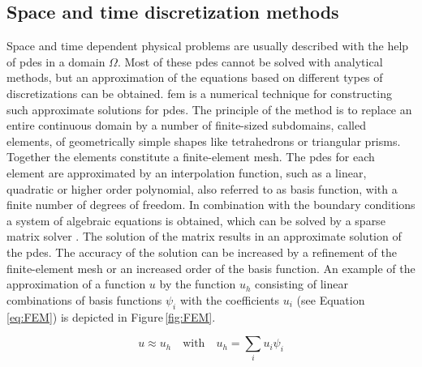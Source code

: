 \subsection{Space and time discretization methods}
\label{subsec:FEM}
\FloatBarrier
Space and time dependent physical problems are usually described with the help of \glspl{pde} in a domain $\Omega$. Most of these \glspl{pde} cannot be solved with analytical methods, but an approximation of the equations based on different types of discretizations can be obtained. \Gls{fem} is a numerical technique for constructing such approximate solutions for \glspl{pde}. The principle of the method is to replace an entire continuous domain by a number of finite-sized subdomains, called elements, of geometrically simple shapes like tetrahedrons or triangular prisms. Together the elements constitute a finite-element mesh. The \glspl{pde} for each element are approximated by an interpolation function, such as a linear, quadratic or higher order polynomial, also referred to as basis function, with a finite number of degrees of freedom. In combination with the boundary conditions a  system of algebraic equations is obtained, which can be solved by a sparse matrix solver \cite{john2016finite}. The solution of the matrix results in an approximate solution of the \glspl{pde}. The accuracy of the solution can be increased by a refinement of the finite-element mesh or an increased order of the basis function. An example of the approximation of a function $u$ by the function $u_{h}$ consisting of linear combinations of basis functions $\psi_{i}$ with the coefficients $u_{i}$ (see Equation\,\ref{eq:FEM}) is depicted in Figure\,\ref{fig:FEM}. 

\begin{equation}
u\approx u_{h} \quad \textrm{with} \quad u_{h}=\sum_{i}u_{i}\psi_{i}
\label{eq:FEM}
\end{equation}

